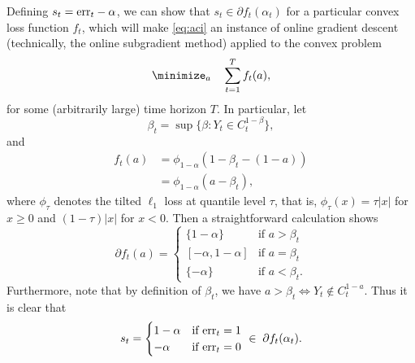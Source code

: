 \documentclass{article}
\begin{document}
Defining $s_t = \mathrm{err}_t - \alpha$, we can show that $s_t \in \partial
f_t(\alpha_t)$ for a particular convex loss function $f_t$, which will make 
\eqref{eq:aci} an instance of online gradient descent (technically, the online
subgradient method) applied to the convex problem
\[
\minimize_a \quad \sum_{t=1}^T f_t(a),
\]
for some (arbitrarily large) time horizon $T$. In particular, let
\[
\beta_t = \sup \{ \beta : Y_t \in C_t^{1-\beta} \}, 
\]
and 
\begin{align*}
\nonumber
f_t(a) &= \phi_{1-\alpha}(1-\beta_t - (1-a)) \\
&= \phi_{1-\alpha}(a - \beta_t),
\end{align*}
where $\phi_\tau$ denotes the tilted $\ell_1$ loss at quantile level $\tau$,
that is, $\phi_\tau(x) = \tau |x|$ for $x \geq 0$ and $(1-\tau) |x|$ for $x <
0$. Then a straightforward calculation shows
\[
\partial f_t(a) = 
\begin{cases}
\{1-\alpha\} & \text{if $a > \beta_t$} \\
[-\alpha, 1-\alpha] & \text{if $a = \beta_t$} \\
\{-\alpha\} & \text{if $a < \beta_t$}.
\end{cases}
\]
Furthermore, note that by definition of $\beta_t$, we have $a > \beta_t \iff Y_t
\notin C_t^{1-a}$. Thus it is clear that
\[
s_t = 
\begin{cases}
1-\alpha & \text{if $\mathrm{err}_t = 1$} \\
-\alpha & \text{if $\mathrm{err}_t = 0$}
\end{cases}
\; \in \; \partial f_t(\alpha_t).
\]



\end{document}
